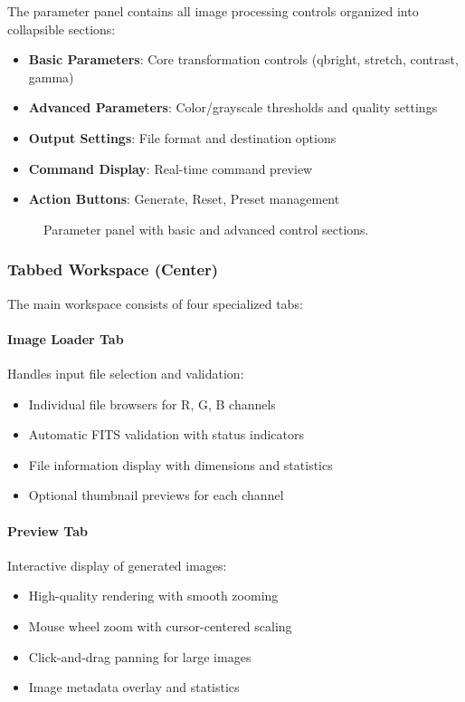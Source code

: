 \documentclass[11pt,a4paper]{article}
\begin{document}
The parameter panel contains all image processing controls organized into
collapsible sections:

\begin{itemize}[leftmargin=*]
\item \textbf{Basic Parameters}: Core transformation controls (qbright,
stretch, contrast, gamma)
\item \textbf{Advanced Parameters}: Color/grayscale thresholds and quality
settings
\item \textbf{Output Settings}: File format and destination options
\item \textbf{Command Display}: Real-time command preview
\item \textbf{Action Buttons}: Generate, Reset, Preset management
\end{itemize}

\begin{figure}[H]
\centering
\caption{Parameter panel with basic and advanced control sections.}
\label{fig:parameter-panel}
\end{figure}

\subsubsection{Tabbed Workspace (Center)}

The main workspace consists of four specialized tabs:

\paragraph{Image Loader Tab}
Handles input file selection and validation:
\begin{itemize}[leftmargin=*]
\item Individual file browsers for R, G, B channels
\item Automatic FITS validation with status indicators
\item File information display with dimensions and statistics
\item Optional thumbnail previews for each channel
\end{itemize}

\paragraph{Preview Tab}
Interactive display of generated images:
\begin{itemize}[leftmargin=*]
\item High-quality rendering with smooth zooming
\item Mouse wheel zoom with cursor-centered scaling
\item Click-and-drag panning for large images
\item Image metadata overlay and statistics
\end{itemize}
\end{document}
